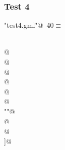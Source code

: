 \documentclass[a4paper]{report}
\begin{document}
\subsubsection{Test 4}
\begin{flushleft} \small
\begin{minipage}{\linewidth}\label{scrap40}\raggedright\small
{} \verb@"test4.gml"@\nobreak\ {\footnotesize {40}}$\equiv$
\vspace{-1ex}
\begin{list}{}{} \item
\mbox{}\verb@@\\
\mbox{}\verb@graph [@\\
\mbox{}\verb@node [@\\
\mbox{}\verb@id 1@\\
\mbox{}\verb@label ""@\\
\mbox{}\verb@]@\\
\mbox{}@\\
\mbox{}@\\
\mbox{}@\\
\mbox{}@\\
\mbox{}@\\
\mbox{}\verb@comment ""@\\
\mbox{}@\\
\mbox{}@\\
\mbox{}\verb@]@\\
\mbox{}\verb@@{\NWsep}
\end{list}
\vspace{-1.5ex}
\footnotesize
\begin{list}{}{\setlength{\itemsep}{-\parsep}\setlength{\itemindent}{-\leftmargin}}

\item{}
\end{list}
\end{minipage}\vspace{4ex}
\end{flushleft}
\end{document}
